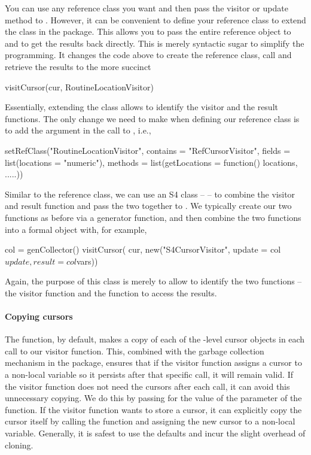 You can use any reference class you want and then pass the visitor or
update method to .  However, it can be convenient to
define your reference class to extend the  class in
the  package. This allows you to pass the entire
reference object to  and to get the results back
directly. This is merely syntactic sugar to simplify the
programming. It changes the code above to create the reference class,
call  and retrieve the results to the more succinct
\begin{RCode}
visitCursor(cur, RoutineLocationVisitor)
\end{RCode}
Essentially, extending the  class allows
 to identify the visitor and the result functions.
The only change we need to make when defining our reference class
is to add the  argument in the call to
, i.e.,
\begin{RCode}
setRefClass("RoutineLocationVisitor",
            contains = "RefCursorVisitor",
            fields = list(locations = "numeric"),
            methods = list(getLocations = function() locations,
                       .....))
\end{RCode}



Similar to the  reference class, we can use
an S4 class --  -- to combine the visitor and
result function and pass the two together to .  We
typically create our two functions as before via a generator function,
and then combine the two functions into a formal object with, for
example,
\begin{RCode}
col = genCollector()
visitCursor( cur, new("S4CursorVisitor",  update = col$update, result = col$vars))
\end{RCode}
Again, the purpose of this  class is merely to
allow  to identify the two functions -- the visitor
function and the function to access the results.


\paragraph{Copying cursors}
The  function, by default, makes a copy of each of
the \C-level cursor objects in each call to our visitor function.
This, combined with the garbage collection mechanism in the package,
ensures that if the visitor function assigns a cursor to a non-local
variable so it persists after that specific call, it will remain
valid.  If the visitor function does not need the cursors after each
call, it can avoid this unnecessary copying.  We do this by passing
\Rfalse{} for the value of the  parameter of the
 function.  If the visitor function wants to store
a cursor, it can explicitly copy the cursor itself by calling the
 function and assigning the new cursor to a non-local
variable.  Generally, it is safest to use the defaults and incur the
slight overhead of cloning.


